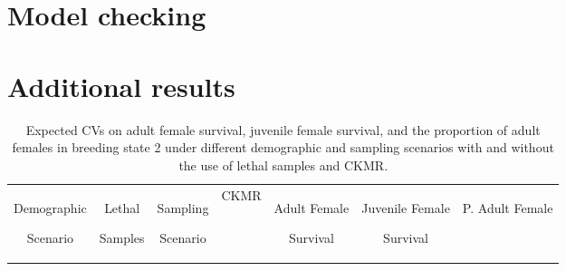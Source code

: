 \pagebreak{}

\section{Model checking\label{sec:Model-checking}}



\pagebreak{}

\section{Additional results\label{sec:Additional-results}}

%
\begin{table}
\caption{Expected CVs on adult female survival, juvenile female survival, and
the proportion of adult females in breeding state 2 under different
demographic and sampling scenarios with and without the use of lethal
samples and CKMR.\label{tab:LH_Expected-CVs}}

\begin{tabular}{|c|c|c|c|c|c|c|}
\hline 
\begin{cellvarwidth}[t]
\centering
Demographic 

Scenario
\end{cellvarwidth} & \begin{cellvarwidth}[t]
\centering
Lethal 

Samples
\end{cellvarwidth} & \begin{cellvarwidth}[t]
\centering
Sampling 

Scenario
\end{cellvarwidth} & CKMR & \begin{cellvarwidth}[t]
\centering
Adult Female 

Survival
\end{cellvarwidth} & \begin{cellvarwidth}[t]
\centering
Juvenile Female 

Survival
\end{cellvarwidth} & \begin{cellvarwidth}[t]
\centering
P. Adult Female 


\end{cellvarwidth}
\end{tabular}
\end{table}
